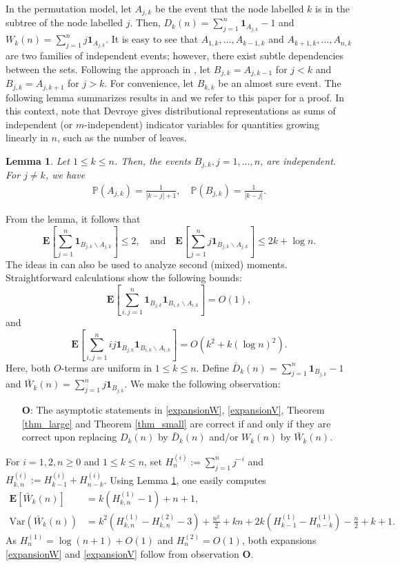 \documentclass{amsart}       %
\newcommand{\E}[1]{\ensuremath{\mathbf{E} \left[#1 \right]}}
\newcommand{\Prob}[1]{\ensuremath{\mathbb{P} \left(#1 \right)}}
\newcommand{\I}[1]{\ensuremath{\mathbf{1}_{  #1  }}}
\newtheorem{lemma}{Lemma}
\begin{document}
In the permutation model, let $A_{j,k}$ be the event that the node labelled $k$ is in the subtree of the node labelled $j$.
Then, $D_k(n) = \sum_{j=1}^n \I{A_{j,k}} -1 $ and
$W_k(n) = \sum_{j=1}^n j \I{A_{j,k}}$.
It is easy to see that  $A_{1, k}, \ldots, A_{k-1,k}$ and $A_{k+1,k}, \ldots, A_{n,k}$ are two families of independent events; however, there exist subtle dependencies between the sets. Following the approach in \cite{denefinger04}, let $B_{j,k} = A_{j,k-1}$ for $j < k$ and $B_{j,k} = A_{j,k+1}$ for $j > k$. 
For convenience, let $B_{k,k}$ be an almost sure event.
The following lemma summarizes results in \cite{denefinger04} and we refer to this paper for a proof. In this context, 
note that Devroye \cite{devcounter}
gives distributional representations as sums of independent (or $m$-independent) indicator variables for quantities growing linearly in $n$, such as the number of leaves.
\begin{lemma} \label{lem_help}
Let $1 \leq k \leq n$.  Then, the events $B_{j,k}, j = 1, \ldots, n$, are independent. For $j \neq k$, we have
\begin{align*} 
\Prob{A_{j,k}} = \frac{1}{|k-j| + 1}, \quad \Prob{B_{j,k}} = \frac{1}{|k-j|}. 
\end{align*}
\end{lemma}
From the lemma, it follows that
$$\E{ \sum_{j = 1}^n \I{B_{j,k} \backslash A_{j,k}}} \leq 2, \quad \text{and} \quad \E{\sum_{j = 1}^n j \I{B_{j,k} \backslash A_{j,k}}} \leq 2k + \log n.$$
The ideas in \cite{denefinger04} can also be used to analyze second (mixed) moments. Straightforward calculations show the following bounds:
$$\E{ \sum_{i,j = 1}^n \I{B_{j,k}} \I{B_{i,k} \backslash A_{i,k}}} = O(1),$$  and $$\E{ \sum_{i,j = 1}^n i j  \I{B_{j,k}} \I{B_{i,k} \backslash A_{i,k}}} = O(k^2 + k(\log n)^2).$$
Here, both $O$-terms are uniform in $1 \leq k \leq n$.
Define $\bar D_k(n) = \sum_{j=1}^n \I{B_{j,k}}-1$ and $\bar W_k(n) = \sum_{j=1}^n j \I{B_{j,k}}$. We make the following observation:

\begin{itemize} \item [\textbf{O}:]
The asymptotic statements in \eqref{expansionW}, \eqref{expansionV}, Theorem \ref{thm_large} and Theorem \ref{thm_small} are correct if and only if they are correct upon replacing $D_k(n)$ by $\bar D_k(n)$ and/or $W_k(n)$ by $\bar W_k(n)$.
\end{itemize}

 For $i=1,2, n \geq 0$ and $1 \leq k \leq n$, set $H^{(i)}_{n} := \sum_{j=1}^n j^{-i}$ and $H^{(i)}_{k,n} :=  H^{(i)}_{k-1} + H^{(i)}_{n-k}$. Using Lemma \ref{lem_help}, one easily computes 
\begin{align*}  \E{\bar W_k(n)} &=   k (H_{k,n}^{(1)}-1) + n  + 1 ,\\
  \text{Var}(\bar W_k(n)) &=  k^2  (H_{k,n}^{(1)} - H_{k,n}^{(2)}-3)  +  \frac{n^2}{2} + kn + 2k (H^{(1)}_{k-1} - H^{(1)}_{n-k}) - \frac n 2 + k + 1.
\end{align*}
As $H^{(1)}_{n} = \log (n+1) + O(1)$ and $H^{(2)}_n = O(1)$, both expansions \eqref{expansionW} 
and  \eqref{expansionV} follow from  observation \textbf{O}.
\end{document}
